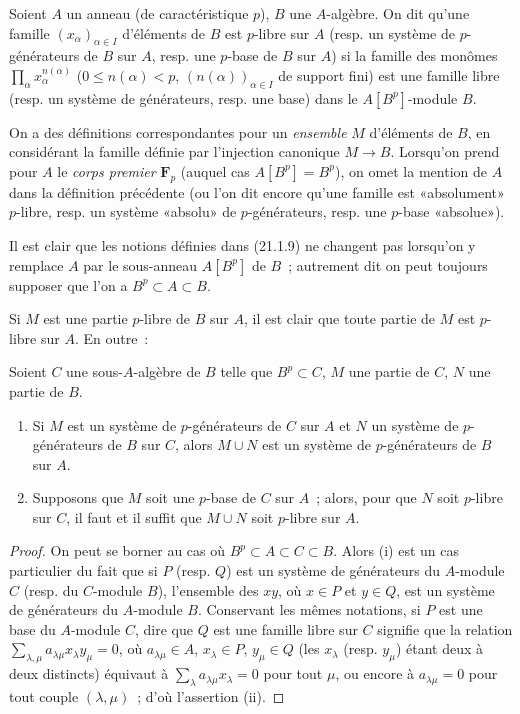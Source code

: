 \begin{definition}[21.1.9]
\label{0.21.1.9-fr}
Soient $A$ un anneau (de caractéristique $p$), $B$ une $A$-algèbre. On dit
qu'une famille $(x_\alpha)_{\alpha\in I}$ d'éléments de $B$ est $p$-libre sur
$A$ (\textup{resp.} un système de $p$-générateurs de $B$ sur $A$, \textup{resp.} une $p$-base
de $B$ sur $A$) si la famille des monômes
$\prod_\alpha x_\alpha^{n(\alpha)}$ ($0\leq n(\alpha)<p$,
$(n(\alpha))_{\alpha\in I}$ de support fini) est une famille libre (\textup{resp.} un
système de générateurs, \textup{resp.} une base) dans le $A[B^p]$-module $B$.
\end{definition}

On a des définitions correspondantes pour un \emph{ensemble} $M$ d'éléments de $B$,
en considérant la famille définie par l'injection canonique $M\to B$.
Lorsqu'on prend pour $A$ le \emph{corps premier} $\mathbf F_p$ (auquel cas
$A[B^p]=B^p$), on omet la mention de $A$ dans la définition précédente (ou
l'on dit encore qu'une famille est «absolument» $p$-libre, resp. un système
«absolu» de $p$-générateurs, resp. une $p$-base «absolue»).

Il est clair que les notions définies dans (21.1.9) ne changent pas lorsqu'on y
remplace $A$ par le sous-anneau $A[B^p]$ de $B$~; autrement dit on peut toujours
supposer que l'on a $B^p\subset A\subset B$.

Si $M$ est une partie $p$-libre de $B$ sur $A$, il est clair que toute partie
de $M$ est $p$-libre sur $A$. En outre~:

\begin{lemma}[21.1.10]
\label{0.21.1.10-fr}
Soient $C$ une sous-$A$-algèbre de $B$ telle que $B^p\subset C$, $M$ une
partie de $C$, $N$ une partie de $B$.
\begin{enumerate}
  \item[\textup{(i)}] Si $M$ est un système de $p$-générateurs de $C$ sur $A$ et $N$
  un système de $p$-générateurs de $B$ sur $C$, alors $M\cup N$ est un système
  de $p$-générateurs de $B$ sur $A$.
  \item[\textup{(ii)}] Supposons que $M$ soit une $p$-base de $C$ sur $A$~; alors,
  pour que $N$ soit $p$-libre sur $C$, il faut et il suffit que $M\cup N$
  soit $p$-libre sur $A$.
\end{enumerate}
\end{lemma}

\begin{proof}
On peut se borner au cas où $B^p\subset A\subset C\subset B$. Alors (i)
est un cas particulier du fait que si $P$ (resp. $Q$) est un système de
générateurs du $A$-module $C$ (resp. du $C$-module $B$), l'ensemble des
$xy$, où $x\in P$ et $y\in Q$, est un système de générateurs du
$A$-module $B$.
Conservant les mêmes notations, si $P$ est une base du $A$-module $C$,
dire que $Q$ est une famille libre sur $C$ signifie que la relation
$\sum_{\lambda,\mu}a_{\lambda\mu}x_\lambda y_\mu=0$, où
$a_{\lambda\mu}\in A$, $x_\lambda\in P$, $y_\mu\in Q$ (les $x_\lambda$
(resp. $y_\mu$) étant deux à deux distincts) équivaut à
$\sum_\lambda a_{\lambda\mu}x_\lambda=0$ pour tout $\mu$, ou encore
à $a_{\lambda\mu}=0$ pour tout couple $(\lambda,\mu)$~; d'où
l'assertion (ii).
\end{proof}

